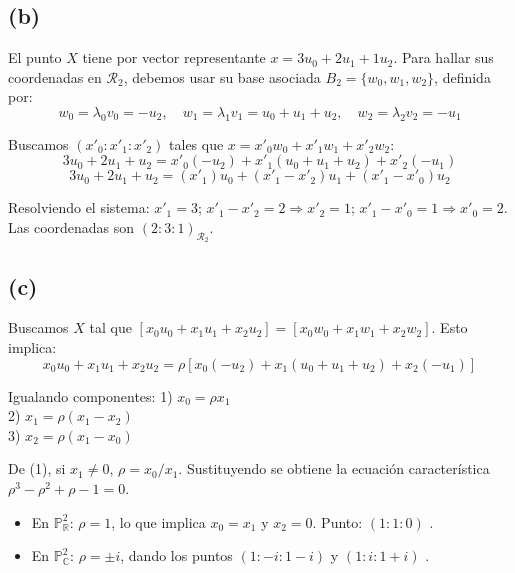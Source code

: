 {\subsection*{(b) }

El punto $X$ tiene por vector representante $x = 3u_0 + 2u_1 + 1u_2$. Para hallar sus coordenadas en $\mathcal{R}_2$, debemos usar su base asociada $B_2 = \{w_0, w_1, w_2\}$, definida por:
\[ w_0 = \lambda_0 v_0 = -u_2, \quad w_1 = \lambda_1 v_1 = u_0 + u_1 + u_2, \quad w_2 = \lambda_2 v_2 = -u_1 \]

Buscamos $(x'_0 : x'_1 : x'_2)$ tales que $x = x'_0 w_0 + x'_1 w_1 + x'_2 w_2$:
\[ 3u_0 + 2u_1 + u_2 = x'_0(-u_2) + x'_1(u_0 + u_1 + u_2) + x'_2(-u_1) \]
\[ 3u_0 + 2u_1 + u_2 = (x'_1)u_0 + (x'_1 - x'_2)u_1 + (x'_1 - x'_0)u_2 \]

Resolviendo el sistema:
$x'_1 = 3$; $x'_1 - x'_2 = 2 \Rightarrow x'_2 = 1$; $x'_1 - x'_0 = 1 \Rightarrow x'_0 = 2$.
Las coordenadas son $(2:3:1)_{\mathcal{R}_2}$.

\subsection*{(c) }

Buscamos $X$ tal que $[x_0 u_0 + x_1 u_1 + x_2 u_2] = [x_0 w_0 + x_1 w_1 + x_2 w_2]$. Esto implica:
\[ x_0 u_0 + x_1 u_1 + x_2 u_2 = \rho [x_0(-u_2) + x_1(u_0 + u_1 + u_2) + x_2(-u_1)] \]

Igualando componentes:
1) $x_0 = \rho x_1$ \\
2) $x_1 = \rho(x_1 - x_2)$ \\
3) $x_2 = \rho(x_1 - x_0)$

De (1), si $x_1 \neq 0$, $\rho = x_0/x_1$. Sustituyendo se obtiene la ecuación característica $\rho^3 - \rho^2 + \rho - 1 = 0$.
\begin{itemize}
    \item En $\mathbb{P}_{\mathbb{R}}^2$: $\rho=1$, lo que implica $x_0=x_1$ y $x_2=0$. Punto: $(1:1:0)$ .
    \item En $\mathbb{P}_{\mathbb{C}}^2$: $\rho = \pm i$, dando los puntos $(1:-i:1-i)$ y $(1:i:1+i)$ .
\end{itemize}
}

